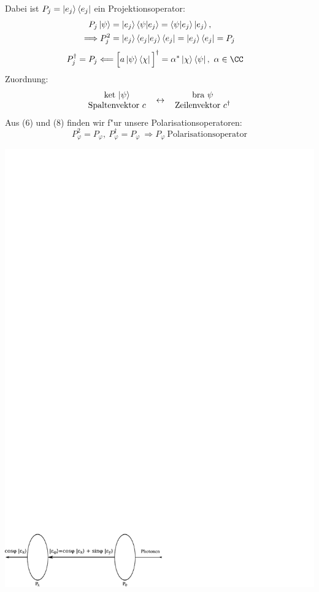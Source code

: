 \documentclass[a4paper]{scrartcl}
\begin{document}
{Dabei ist $P_j = \ket{e_j} \bra{e_j}$ ein Projektionsoperator:
\begin{align}
P_j \ket{\psi} & = \ket {e_j} \braket{ \psi| e_j}  = \braket{ \psi | e_j} \ket{e_j}, \\
\Longrightarrow P_j^2 & = \ket{e_j} \braket{e_j | e_j } \bra{e_j} = \ket{e_j} \bra{e_j} = P_j \notag
\end{align}
\begin{align}
P_j^\dagger & = P_j \Longleftarrow \Big[ a \ket{\psi}\bra{\chi} \Big]^\dagger = \alpha^* \ket{\chi} \bra{\psi}, \ \alpha \in \CC
\end{align}
Zuordnung:
\begin{align}
\mathrm{
\begin{tabular}{c c c}
ket $\ket{\psi}$ & \multirow{2}{*}{$\leftrightarrow$} & bra $\psi$ \\
Spaltenvektor $c$ & & Zeilenvektor $c^\dagger$
\end{tabular}
}
\end{align}
Aus (6) und (8) finden wir f"ur unsere Polarisationsoperatoren:
$$P_\varphi^2 = P_\varphi, \ P_\varphi^\dagger = P_\varphi \ \Longrightarrow P_\varphi \mathrm{ \ Polarisationsoperator}$$
\begin{center}
\includegraphics{030Polarisationsfilter}

\end{center}}
\end{document}

